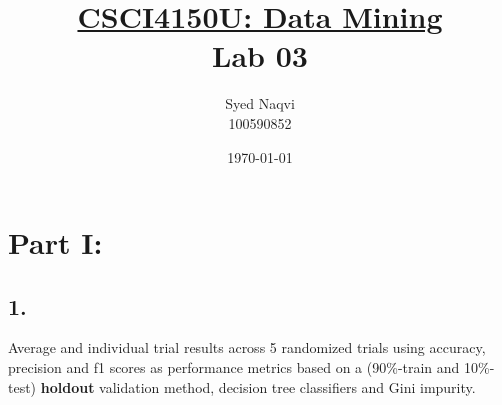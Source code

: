 \documentclass{article}
\title{\textbf{\underline{CSCI4150U: Data Mining}\\Lab 03}}
\author{Syed Naqvi\\100590852}
\date{\today}
\begin{document}
    \maketitle
    
    \section*{Part I:}

    \subsection*{1.}

    Average and individual trial results across 5 randomized trials using accuracy, precision and f1 scores as performance metrics based on
    a (90\%-train and 10\%-test) \textbf{holdout} validation method, decision tree classifiers and Gini impurity.
\end{document}
